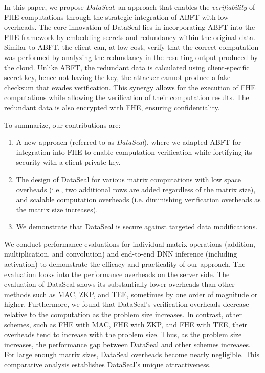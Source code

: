 In this paper, we propose \textit{DataSeal}, an approach that enables the \textit{verifiability} of FHE computations through the strategic integration of ABFT with low overheads. The core innovation of DataSeal lies in incorporating ABFT into the FHE framework by embedding secrets and redundancy within the original data. 
Similar to ABFT, the client can, at low cost, verify that the correct computation was performed by analyzing the redundancy in the resulting output produced by the cloud. Unlike ABFT, the redundant data is calculated using client-specific secret key, hence not having the key, the attacker cannot produce a fake checksum that evades verification. This synergy allows for the execution of FHE computations while allowing the verification of their computation results. The redundant data is also encrypted with FHE, ensuring confidentiality.  

To summarize, our contributions are:
\begin{enumerate}
\item A new approach (referred to as {\em DataSeal}), where we adapted ABFT for integration into FHE to enable computation verification while fortifying its security with a client-private key.  
\item The design of DataSeal for various matrix computations with low space overheads (i.e., two additional rows are added regardless of the matrix size), and scalable computation overheads (i.e. diminishing verification overheads as the matrix size increases). 
\item We demonstrate that DataSeal is secure against targeted data modifications. 
\end{enumerate}

We conduct performance evaluations for individual matrix operations (addition, multiplication, and convolution) and end-to-end DNN inference (including activation) to demonstrate the efficacy and practicality of our approach. The evaluation looks into the performance overheads on the server side. The evaluation of DataSeal shows its substantially lower overheads than other methods such as MAC, ZKP, and TEE, sometimes by one order of magnitude or higher. Furthermore, we found that DataSeal's verification overheads decrease relative to the computation as the problem size increases. In contrast, other schemes, such as FHE with MAC, FHE with ZKP, and FHE with TEE, their overheads tend to increase with the problem size. Thus, as the problem size increases, the performance gap between DataSeal and other schemes increases. For large enough matrix sizes, DataSeal overheads become nearly negligible.   This comparative analysis establishes DataSeal's unique attractiveness.


